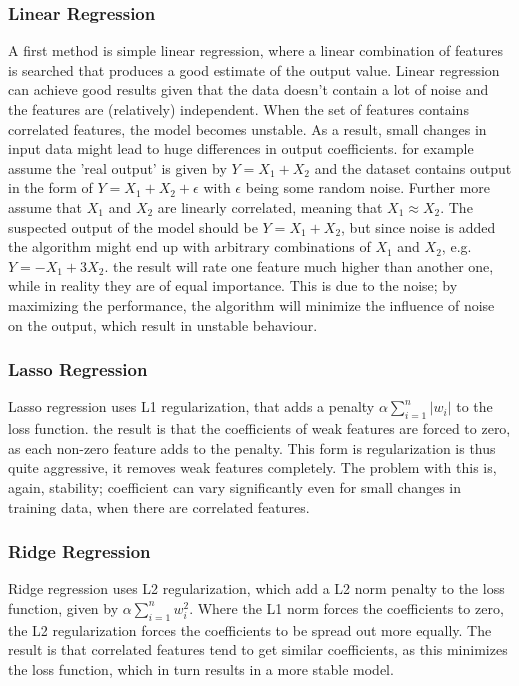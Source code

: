 \subsubsection{Linear Regression}

A first method is simple linear regression, where a linear combination of features is searched that produces a good estimate of the output value. Linear regression can achieve good results given that the data doesn't contain a lot of noise and the features are (relatively) independent. When the set of features contains correlated features, the model becomes unstable. As a result, small changes in input data might lead to huge differences in output coefficients. for example assume the 'real output' is given by $Y = X_1 + X_2$ and the dataset contains output in the form of $Y = X_1 + X_2 + \epsilon$ with $\epsilon$ being some random noise. Further more assume that $X_1$ and $X_2$ are linearly correlated, meaning that $X_1 \approx X_2$. The suspected output of the model should be $Y = X_1 + X_2$, but since noise is added the algorithm might end up with arbitrary combinations of $X_1$ and $X_2$, e.g. $Y = -X_1 + 3X_2$. the result will rate one feature much higher than another one, while in reality they are of equal importance. This is due to the noise; by maximizing the performance, the algorithm will minimize the influence of noise on the output, which result in unstable behaviour.

\subsubsection{Lasso Regression}
Lasso regression uses L1 regularization, that adds a penalty $\alpha\sum\limits_{i=1}^{n} |w_i|$ to the loss function. the result is that the coefficients of weak features are forced to zero, as each non-zero feature adds to the penalty. This form is regularization is thus quite aggressive, it removes weak features completely. The problem with this is, again, stability; coefficient can vary significantly even for small changes in training data, when there are correlated features.

\subsubsection{Ridge Regression}
Ridge regression uses L2 regularization, which add a L2 norm penalty to the loss function, given by $\alpha\sum\limits_{i=1}^{n} w_i^2$. Where the L1 norm forces the coefficients to zero, the L2 regularization forces the coefficients to be spread out more equally. The result is that correlated features tend to get similar coefficients, as this minimizes the loss function, which in turn results in a more stable model. 

